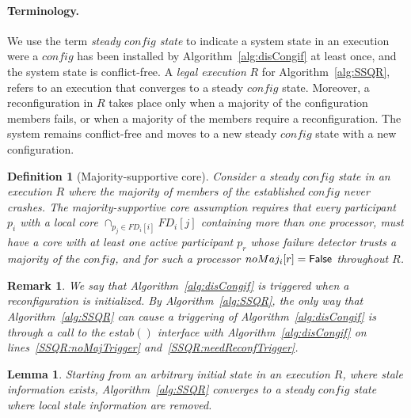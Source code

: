 \documentclass[11pt]{article}
\newcommand{\configEstab}{estab}
\newtheorem{lemma}[theorem]{Lemma}
\newtheorem{remark}{Remark}
\newtheorem{definition}{Definition}[section]
\begin{document}
\paragraph{Terminology.} We use the term \emph{steady $config$ state} to indicate a system state in an execution were a $config$ has been installed by Algorithm~\ref{alg:disCongif} at least once, and the system state is conflict-free.
A \emph{legal execution} $R$ for Algorithm~\ref{alg:SSQR}, refers to an execution that converges to a steady $config$ state.
Moreover, a reconfiguration in $R$ takes place only when a majority of the configuration members fails, or when a majority of the members require a reconfiguration.
The system remains conflict-free and moves to a new steady $config$ state with a new configuration.

\begin{definition} [Majority-supportive core]
\label{def:majSupCore}
Consider a steady $config$ state in an execution $R$ where the majority of members of the established $config$ never crashes.
The \emph{majority-supportive core} assumption requires that every participant $p_i$ with a local core  $\cap_{p_j \in FD_i[i]}FD_i[j]$ containing more than one processor, must have a core with at least one active participant $p_r$ whose failure detector trusts a majority of the $config$, and for such a processor $noMaj_i[r] = \sf False$ throughout $R$. 
\end{definition}

\begin{remark}
\label{rem:reconfThroughInterface}
We say that Algorithm~\ref{alg:disCongif} is \emph{triggered} when a reconfiguration is initialized. By Algorithm~\ref{alg:SSQR}, the only way that Algorithm~\ref{alg:SSQR} can cause a triggering of Algorithm~\ref{alg:disCongif} is through a call to the $\configEstab()$ interface with Algorithm~\ref{alg:disCongif} on lines~\ref{SSQR:noMajTrigger} and~\ref{SSQR:needReconfTrigger}.
\end{remark}


\begin{lemma}
\label{thQ:reachSteady}
Starting from an arbitrary initial state in an execution $R$, where stale information exists, Algorithm~\ref{alg:SSQR} converges to a steady $config$ state where local stale information are removed.
\end{lemma}
\end{document}
